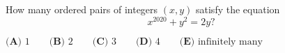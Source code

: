 How many ordered pairs of integers $(x, y)$ satisfy the equation$$x^{2020}+y^2=2y?$$

$\textbf{(A) } 1 \qquad\textbf{(B) } 2 \qquad\textbf{(C) } 3 \qquad\textbf{(D) } 4 \qquad\textbf{(E) } \text{infinitely many}$